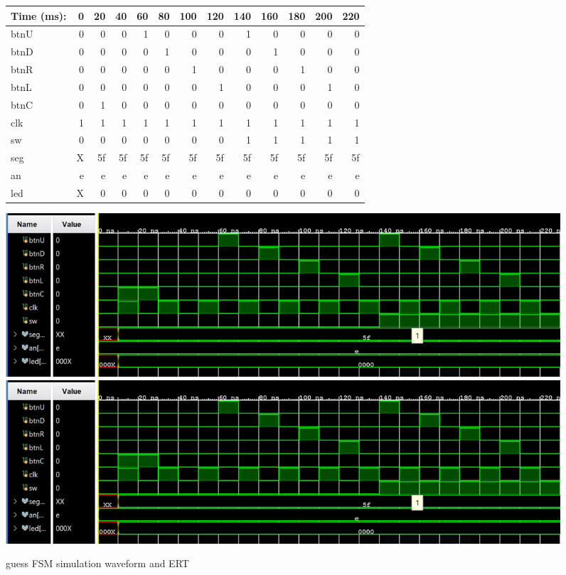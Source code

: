\documentclass[11pt]{article}
\begin{document}
\begin{figure}[ht]\centering
	\begin{tabular}{l|rrrrrrrrrrrr}
		Time (ms): & 0 & 20 & 40 & 60 & 80  & 100 & 120 & 140 & 160 & 180 & 200 & 220 \\
		\midrule
		btnU & 0 & 0 & 0 & 1 & 0 & 0 & 0 & 1 & 0 & 0 & 0 & 0  \\
		btnD & 0 & 0 & 0 & 0 & 1 & 0 & 0 & 0 & 1 & 0 & 0 & 0  \\
		btnR & 0 & 0 & 0 & 0 & 0 & 1 & 0 & 0 & 0 & 1 & 0 & 0  \\
		btnL & 0 & 0 & 0 & 0 & 0 & 0 & 1 & 0 & 0 & 0 & 1 & 0  \\
		btnC & 0 & 1 & 0 & 0 & 0 & 0 & 0 & 0 & 0 & 0 & 0 & 0  \\
		clk & 1 & 1 & 1 & 1 & 1 & 1 & 1 & 1 & 1 & 1 & 1 & 1  \\
		sw & 0 & 0 & 0 & 0 & 0 & 0 & 0 & 1 & 1 & 1 & 1 & 1  \\
		\midrule
		seg & X & 5f & 5f & 5f & 5f & 5f & 5f & 5f & 5f & 5f & 5f & 5f  \\
		an & e & e & e & e & e & e & e & e & e & e & e & e  \\
		led & X & 0 & 0 & 0 & 0 & 0 & 0 & 0 & 0 & 0 & 0 & 0  \\
		\bottomrule
	\end{tabular}\medskip
	
	\includegraphics[trim=0cm 0cm 9cm 0cm,clip]{guessing_game_test.JPG}
	\includegraphics[trim=14.5cm 0cm 0cm 0cm,clip]{guessing_game_test.JPG}
	
	\caption{guess FSM simulation waveform and ERT}
	\label{fig:sim_with_table}
\end{figure}
\end{document}
